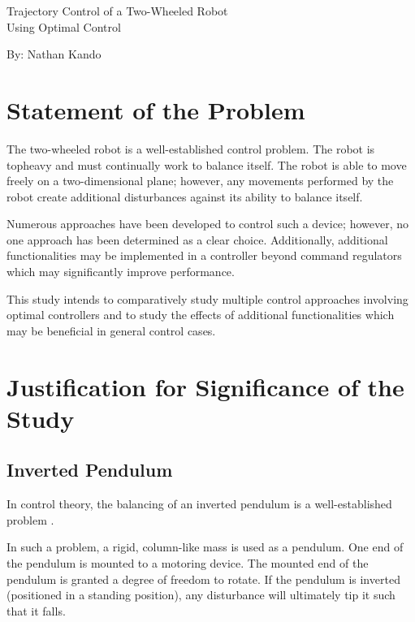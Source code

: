 \documentclass[crop=false,float=true,class=scrartcl]{standalone}
\begin{document}
\begin{center}
\LARGE
Trajectory Control of a Two-Wheeled Robot \\ 
Using Optimal Control

\large
By: Nathan Kando
\end{center}

\tableofcontents




\clearpage




\section{Statement of the Problem}

The two-wheeled robot is a well-established control problem.  
The robot is topheavy and must continually work to balance itself.
The robot is able to move freely on a two-dimensional plane; however,
any movements performed by the robot create additional disturbances
against its ability to balance itself.

Numerous approaches have been developed to control such a device;
however, no one approach has been determined as a clear choice.
Additionally, additional functionalities may be implemented 
in a controller beyond command regulators
which may significantly improve performance.

This study intends to comparatively study multiple control approaches involving optimal controllers
and to study the effects of additional functionalities which may be beneficial in general control cases.




\clearpage




\section{Justification for Significance of the Study}
\label{SEC:justification}




\subsection{Inverted Pendulum}
\label{SEC:justification:inverted pendulum}

In control theory, the balancing of an inverted pendulum is a well-established problem \cite{REF:Textbook:1995-Vaccaro}.

In such a problem, a rigid, column-like mass is used as a pendulum.
One end of the pendulum is mounted to a motoring device.
The mounted end of the pendulum is granted a degree of freedom to rotate.
If the pendulum is inverted {\fns(positioned in a standing position)},
any disturbance will ultimately tip it such that it falls.
\end{document}
